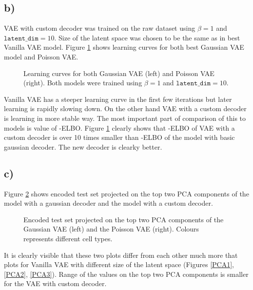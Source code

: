 \documentclass[a4paper,11pt]{article}
\begin{document}
\subsection*{b)}
VAE with custom decoder was trained on the raw dataset using $\beta=1$ and $\texttt{latent\_dim}=10$. Size of the latent space was chosen to be the same as in best Vanilla VAE model. Figure \ref{VAE:comp} shows learning curves for both best Gaussian VAE model and Poisson VAE.
\begin{figure}[H]
    \centering
    \qquad
    \caption{Learning curves for both Gaussian VAE (left) and Poisson VAE (right). Both models were trained using $\beta=1$ and $\texttt{latent\_dim}=10$.}%
    \label{VAE:comp}
\end{figure}
\noindent Vanilla VAE has a steeper learning curve in the first few iterations but later learning is rapidly slowing down. On the other hand VAE with a custom decoder is learning in more stable way. The most important part of comparison of this to models is value of -ELBO. Figure \ref{VAE:comp} clearly shows that -ELBO of VAE with a custom decoder is over 10 times smaller than -ELBO of the model with basic gaussian decoder. The new decoder is clearky better. 

\subsection*{c)}
Figure \ref{VAE:PCAcomp} shows encoded test set projected on the top two PCA components of the model with a gaussian decoder and the model with a custom decoder.
\begin{figure}[H]
    \centering
    \qquad
    \caption{Encoded test set projected on the top two PCA components of the Gaussian VAE (left) and the Poisson VAE (right). Colours represents different cell types.}%
    \label{VAE:PCAcomp}
\end{figure}
\noindent It is clearly visible that these two plots differ from each other much more that plots for Vanilla VAE with different size of the latent space (Figures \ref{PCA1}, \ref{PCA2}, \ref{PCA3}). Range of the values on the top two PCA components is smaller for the VAE with custom decoder.
\end{document}
